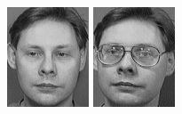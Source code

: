 \begin{figure}[ht]
 \includegraphics[width=\columnwidth/11]{ch3/figures/s4_7.png}
 \includegraphics[width=\columnwidth/11]{ch3/figures/s4_8.png}

\end{figure}
